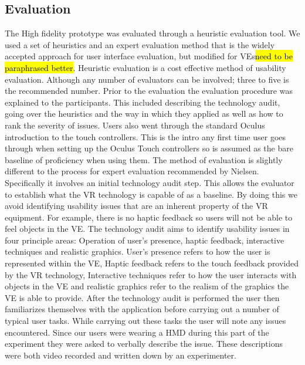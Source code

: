 \documentclass{article}
\begin{document}
\subsection{Evaluation}
The High fidelity prototype was evaluated through a heuristic evaluation tool\cite{Bowman2002}. We used a set of heuristics and an expert evaluation method that is the widely accepted approach for user interface evaluation, but modified for VEs\cite{Sutcliffe2004}\hl{need to be paraphrased better}. Heuristic evaluation is a cost effective method of usability evaluation\cite{nielsen1990heuristic}. Although any number of evaluators can be involved; three to five is the recommended number\cite{nielsen1990heuristic}.
\newline\newline
Prior to the evaluation the evaluation procedure was explained to the participants. This included describing the technology audit, going over the heuristics and the way in which they applied as well as how to rank the severity of issues. Users also went through the standard Oculus introduction to the touch controllers. This is the intro any first time user goes through when setting up the Oculus Touch controllers so is assumed as the bare baseline of proficiency when using them.
\newline\newline
The method of evaluation is slightly different to the process for expert evaluation recommended by Nielsen\cite{Sutcliffe2004}. Specifically it involves an initial technology audit step. This allows the evaluator to establish what the VR technology is capable of as a baseline. By doing this we avoid identifying usability issues that are an inherent property of the VR equipment. For example, there is no haptic feedback so users will not be able to feel objects in the VE. The technology audit aims to identify usability issues in four principle areas: Operation of user's presence, haptic feedback, interactive techniques and realistic graphics. User's presence refers to how the user is represented within the VE, Haptic feedback refers to the touch feedback provided by the VR technology, Interactive techniques refer to how the user interacts with objects in the VE and realistic graphics refer to the realism of the graphics the VE is able to provide.
\newline\newline
After the technology audit is performed the user then familiarizes themselves with the application before carrying out a number of typical user tasks. While carrying out these tasks the user will note any issues encountered. Since our users were wearing a HMD during this part of the experiment they were asked to verbally describe the issue. These descriptions were both video recorded and written down by an experimenter.
\end{document}
